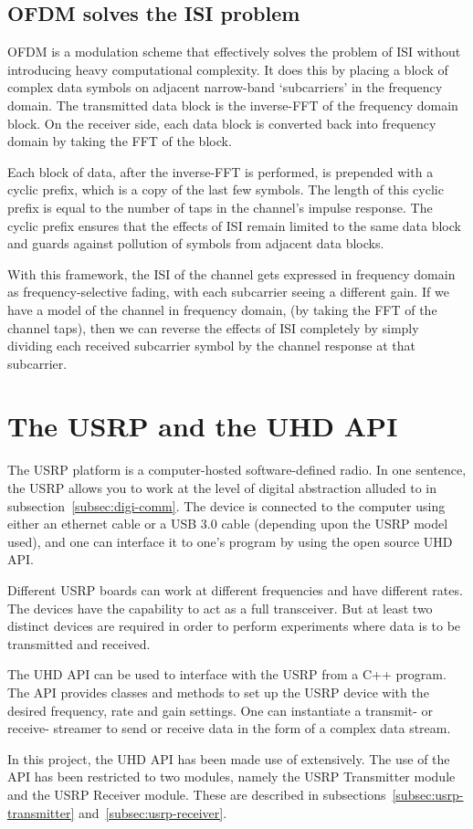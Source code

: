 \subsection{OFDM solves the ISI problem}

OFDM is a modulation scheme that effectively solves the problem of ISI without
introducing heavy computational complexity. It does this by placing a block of
complex data symbols on adjacent narrow-band `subcarriers' in the frequency
domain. The transmitted data block is the inverse-FFT of the frequency domain
block. On the receiver side, each data block is converted back into frequency
domain by taking the FFT of the block.

Each block of data, after the inverse-FFT is performed, is prepended with a
cyclic prefix, which is a copy of the last few symbols. The length of this
cyclic prefix is equal to the number of taps in the channel's impulse response.
The cyclic prefix ensures that the effects of ISI remain limited to the same
data block and guards against pollution of symbols from adjacent data blocks.

With this framework, the ISI of the channel gets expressed in frequency domain
as frequency-selective fading, with each subcarrier seeing a different gain.
If we have a model of the channel in frequency domain, (by taking the FFT of
the channel taps), then we can reverse the effects of ISI completely by simply
dividing each received subcarrier symbol by the channel response at that
subcarrier.


\section{The USRP and the UHD API}

The USRP platform is a computer-hosted software-defined radio. In one sentence,
the USRP allows you to work at the level of digital abstraction alluded to in
subsection~\ref{subsec:digi-comm}. The device is connected to the computer
using either an ethernet cable or a USB 3.0 cable (depending upon the USRP
model used), and one can interface it to one's program by using the open source
UHD API.

Different USRP boards can work at different frequencies and have different
rates. The devices have the capability to act as a full transceiver. But at
least two distinct devices are required in order to perform experiments where
data is to be transmitted and received.

The UHD API can be used to interface with the USRP from a C++ program. The API
provides classes and methods to set up the USRP device with the desired
frequency, rate and gain settings. One can instantiate a transmit- or receive-
streamer to send or receive data in the form of a complex data stream.

In this project, the UHD API has been made use of extensively. The use of the
API has been restricted to two modules, namely the USRP Transmitter module and
the USRP Receiver module. These are described in
subsections~\ref{subsec:usrp-transmitter} and~\ref{subsec:usrp-receiver}.

